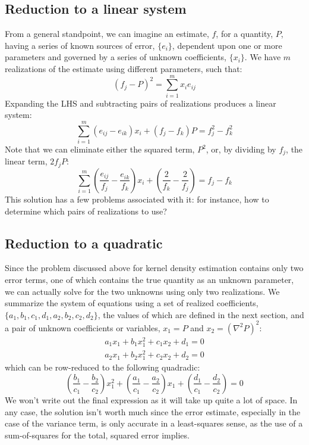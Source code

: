 \subsection{Reduction to a linear system}

From a general standpoint, we can imagine an estimate, $f$, for a quantity,
$P$, having a series of known sources of error, $\lbrace e_i \rbrace$,
dependent upon one or more parameters and governed by a series of 
unknown coefficients, $\lbrace x_i \rbrace$.  
We have $m$ realizations of the estimate using different parameters, 
such that:
\begin{equation}
(f_j - P)^2 = \sum_{i=1}^m x_i e_{ij}
\end{equation}
Expanding the LHS and subtracting pairs of realizations produces  
a linear system:
\begin{equation}
\sum_{i=1}^m (e_{ij} - e_{ik}) x_i + (f_j - f_k) P = f_j^2 - f_k^2
\end{equation}
Note that we can eliminate either the squared term, $P^2$, or, 
by dividing by $f_j$,
the linear term, $2 f_j P$:
\begin{equation}
\sum_{i=1}^m \left ( \frac{e_{ij}}{f_j} - \frac{e_{ik}}{f_k} \right ) x_i 
+ \left ( \frac{2}{f_k} - \frac{2}{f_j} \right ) =  f_j - f_k
\end{equation}
This solution has a few problems associated with it: 
for instance, how to determine
which pairs of realizations to use?

\subsection{Reduction to a quadratic}

Since the problem discussed above for kernel density estimation contains
only two error terms, one of which contains the true quantity as an
unknown parameter, we can
actually solve for the two unknowns using only two realizations.
We summarize the system of equations using 
a set of realized coefficients, 
$\lbrace a_1, b_1, c_1, d_1, a_2, b_2, c_2, d_2 \rbrace$,
the values of which are defined in the next section,
and a pair of unknown coefficients or variables, $x_1=P$ 
and $x_2=(\nabla^2 P)^2$:
\begin{eqnarray}
a_1 x_1 + b_1 x_1^2 + c_1 x_2 + d_1 = 0\\
a_2 x_1 + b_2 x_1^2 + c_2 x_2 + d_2 = 0
\end{eqnarray}
which can be row-reduced to the following quadradic:
\begin{equation}
\left (\frac{b_1}{c_1} - \frac{b_2}{c_2} \right ) x_1^2 +
\left (\frac{a_1}{c_1} - \frac{a_2}{c_2} \right ) x_1 +
\left (\frac{d_1}{c_1} - \frac{d_2}{c_2} \right ) = 0
\end{equation}
We won't write out the final expression as it will take up quite a lot of space.
In any case, the solution isn't worth much since the error estimate, 
especially in the case of the variance term, is only accurate in a 
least-squares sense, as the use of a sum-of-squares for the total, 
squared error implies.

